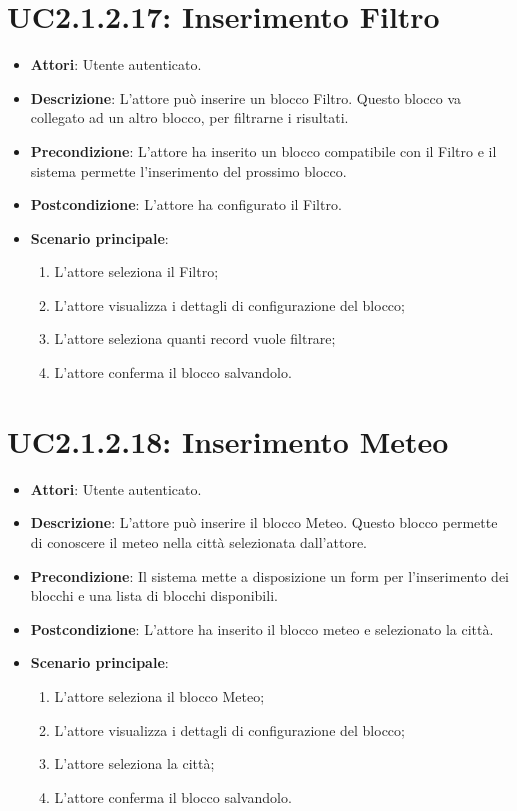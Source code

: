 \section{UC2.1.2.17: Inserimento Filtro}
\label{UC2.1.2.17}
\begin{itemize}
	\item \textbf{Attori}: Utente autenticato.
	\item \textbf{Descrizione}: L'attore può inserire un blocco Filtro. Questo blocco va collegato ad un altro blocco, per filtrarne i risultati. 
	\item \textbf{Precondizione}: L'attore ha inserito un blocco compatibile con il Filtro e il sistema permette l'inserimento del prossimo blocco.
	\item \textbf{Postcondizione}: L'attore ha configurato il Filtro. 
	\item \textbf{Scenario principale}:
	\begin{enumerate} \item L'attore seleziona il Filtro; \item L'attore visualizza i dettagli di configurazione del blocco; \item  L'attore seleziona quanti record vuole filtrare; \item L'attore conferma il blocco salvandolo.\end{enumerate}
\end{itemize}

\section{UC2.1.2.18: Inserimento Meteo}
\label{UC2.1.2.18}
\begin{itemize}
	\item \textbf{Attori}: Utente autenticato.
	\item \textbf{Descrizione}: L'attore può inserire il blocco Meteo. Questo blocco permette di conoscere il meteo nella città selezionata dall'attore.
	\item \textbf{Precondizione}: Il sistema mette a disposizione un form per l'inserimento dei blocchi e una lista di blocchi disponibili.	
	\item \textbf{Postcondizione}: L'attore ha inserito il blocco meteo e selezionato la città.
	\item \textbf{Scenario principale}:
	\begin{enumerate} \item L'attore seleziona il blocco Meteo; \item L'attore visualizza i dettagli di configurazione del blocco; \item  L'attore seleziona la città; \item L'attore conferma il blocco salvandolo.\end{enumerate}
\end{itemize}

